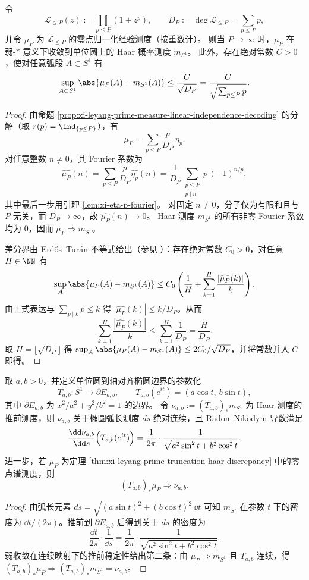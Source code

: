 \begin{theorem}\label{thm:xi-leyang-prime-truncation-haar-discrepancy}
令
\[
\mathcal L_{\le P}(z):=\prod_{p\le P}(1+z^p),
\qquad
D_P:=\deg\mathcal L_{\le P}=\sum_{p\le P}p,
\]
并令 \(\mu_P\) 为 \(\mathcal L_{\le P}\) 的零点归一化经验测度（按重数计）。
则当 \(P\to\infty\) 时，\(\mu_P\) 在弱-\(\ast\) 意义下收敛到单位圆上的 Haar 概率测度 \(m_{S^1}\)。
此外，存在绝对常数 \(C>0\)，使对任意弧段 \(A\subset S^1\) 有
\[
\sup_{A\subset S^1}\abs{\mu_P(A)-m_{S^1}(A)}
\le \frac{C}{\sqrt{D_P}}
=\frac{C}{\sqrt{\sum_{p\le P}p}}.
\]
\end{theorem}
\begin{proof}
由命题 \ref{prop:xi-leyang-prime-measure-linear-independence-decoding} 的分解（取 \(r(p)=\ind_{\{p\le P\}}\)），有
\[
\mu_P=\sum_{p\le P}\frac{p}{D_P}\,\eta_p.
\]
对任意整数 \(n\neq 0\)，其 Fourier 系数为
\[
\widehat{\mu_P}(n)
=\sum_{p\le P}\frac{p}{D_P}\widehat{\eta_p}(n)
=\frac1{D_P}\sum_{\substack{p\le P\\ p\mid n}}p\,(-1)^{n/p},
\]
其中最后一步用引理 \ref{lem:xi-eta-p-fourier}。
对固定 \(n\neq 0\)，分子仅为有限和且与 \(P\) 无关，而 \(D_P\to\infty\)，故 \(\widehat{\mu_P}(n)\to 0\)。
Haar 测度 \(m_{S^1}\) 的所有非零 Fourier 系数均为 \(0\)，因而 \(\mu_P\Rightarrow m_{S^1}\)。
\par
差分界由 Erd\H{o}s--Tur\'an 不等式给出（参见 \cite{KuipersNiederreiter1974}）：存在绝对常数 \(C_0>0\)，对任意 \(H\in\NN\) 有
\[
\sup_A\abs{\mu_P(A)-m_{S^1}(A)}
\le C_0\left(\frac1H+\sum_{k=1}^H\frac{|\widehat{\mu_P}(k)|}{k}\right).
\]
由上式表达与 \(\sum_{p\mid k}p\le k\) 得
\(
|\widehat{\mu_P}(k)|\le k/D_P
\)，从而
\[
\sum_{k=1}^H\frac{|\widehat{\mu_P}(k)|}{k}\le \sum_{k=1}^H\frac1{D_P}=\frac{H}{D_P}.
\]
取 \(H=\lfloor\sqrt{D_P}\rfloor\) 得
\(
\sup_A\abs{\mu_P(A)-m_{S^1}(A)}\le 2C_0/\sqrt{D_P}
\)，并将常数并入 \(C\) 即得。
\end{proof}

\begin{proposition}\label{prop:xi-godel-ellipse-pushforward-density}
取 \(a,b>0\)，并定义单位圆到轴对齐椭圆边界的参数化
\[
T_{a,b}:S^1\to \partial E_{a,b},
\qquad
T_{a,b}(e^{it})=(a\cos t,\ b\sin t),
\]
其中 \(\partial E_{a,b}\) 为 \(x^2/a^2+y^2/b^2=1\) 的边界。
令
\(
\nu_{a,b}:=(T_{a,b})_*m_{S^1}
\)
为 Haar 测度的推前测度，则 \(\nu_{a,b}\) 关于椭圆弧长测度 \(ds\) 绝对连续，且 Radon--Nikodym 导数满足
\[
\frac{\dd\nu_{a,b}}{\dd s}\Bigl(T_{a,b}(e^{it})\Bigr)
=\frac1{2\pi}\cdot\frac1{\sqrt{a^2\sin^2 t+b^2\cos^2 t}}.
\]
进一步，若 \(\mu_P\) 为定理 \ref{thm:xi-leyang-prime-truncation-haar-discrepancy} 中的零点谱测度，则
\[
(T_{a,b})_*\mu_P\Rightarrow \nu_{a,b}.
\]
\end{proposition}
\begin{proof}
由弧长元素
\(
ds=\sqrt{(a\sin t)^2+(b\cos t)^2}\,\dd t
\)
可知 \(m_{S^1}\) 在参数 \(t\) 下的密度为 \(\dd t/(2\pi)\)。推前到 \(\partial E_{a,b}\) 后得到关于 \(ds\) 的密度为
\[
\frac{\dd t}{2\pi}\cdot \frac1{\dd s}
=\frac1{2\pi}\cdot\frac1{\sqrt{a^2\sin^2 t+b^2\cos^2 t}}.
\]
弱收敛在连续映射下的推前稳定性给出第二条：由 \(\mu_P\Rightarrow m_{S^1}\) 且 \(T_{a,b}\) 连续，得 \((T_{a,b})_*\mu_P\Rightarrow (T_{a,b})_*m_{S^1}=\nu_{a,b}\)。
\end{proof}

